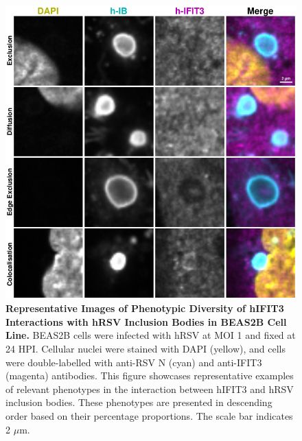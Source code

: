 \begin{figure}
    \centering
    \includegraphics[width=1\linewidth]{08. Chapter 3/Figs/02. Infection/03. IFIT3/06. beas2b i3.pdf}
    \caption[Representative Images of Phenotypic Diversity of hIFIT3 Interactions with hRSV Inclusion Bodies in BEAS2B Cell Line]{\textbf{Representative Images of Phenotypic Diversity of hIFIT3 Interactions with hRSV Inclusion Bodies in BEAS2B Cell Line.} BEAS2B cells were infected with hRSV at MOI 1 and fixed at 24 HPI. Cellular nuclei were stained with DAPI (yellow), and cells were double-labelled with anti-RSV N (cyan) and anti-IFIT3 (magenta) antibodies. This figure showcases representative examples of relevant phenotypes in the interaction between hIFIT3 and hRSV inclusion bodies. These phenotypes are presented in descending order based on their percentage proportions. The scale bar indicates 2 \(\mu \mbox{m}\).}
    \label{fig:Representative Images of Phenotypic Diversity of hIFIT3 Interactions with hRSV Inclusion Bodies in BEAS2B Cell Line}
\end{figure}

